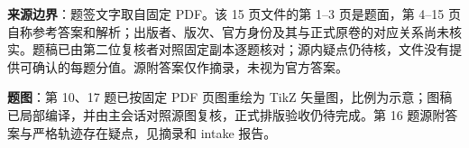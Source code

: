 

\begin{gktip}
\textbf{来源边界}：题签文字取自固定 PDF。该 15 页文件的第 1–3 页是题面，第 4–15 页自称参考答案和解析；出版者、版次、官方身份及其与正式原卷的对应关系尚未核实。题稿已由第二位复核者对照固定副本逐题核对；源内疑点仍待核，文件没有提供可确认的每题分值。源附答案仅作摘录，未视为官方答案。

\textbf{题图}：第 10、17 题已按固定 PDF 页图重绘为 TikZ 矢量图，比例为示意；图稿已局部编译，并由主会话对照源图复核，正式排版验收仍待完成。第 16 题源附答案与严格轨迹存在疑点，见摘录和 intake 报告。
\end{gktip}


